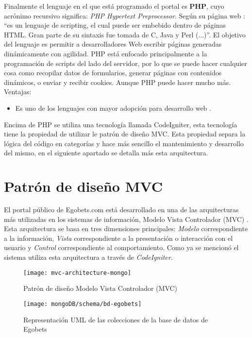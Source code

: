 Finalmente el lenguaje en el que está programado el portal es \textbf{PHP}, cuyo acrónimo recursivo significa: \emph{PHP Hypertext Preprocessor}. Según su página web \cite{phpWeb}: ``es un lenguaje de scripting, el cual puede ser embebido dentro de páginas HTML. Gran parte de su sintaxis fue tomada de C, Java y Perl (...)''. El objetivo del lenguaje es permitir a desarrolladores Web escribir páginas generadas dinámicamente con agilidad.
PHP está enfocado principalmente a la programación de scripts del lado del servidor, por lo que se puede hacer cualquier cosa como recopilar datos de formularios, generar páginas con contenidos dinámicos, o enviar y recibir cookies. Aunque PHP puede hacer mucho más.
				 Ventajas:
	\begin{itemize}
		\item Es uno de los lenguajes con mayor adopción para desarrollo web \cite{tiobeIndex}.
	\end{itemize}

Encima de PHP se utiliza una tecnología llamada CodeIgniter, esta tecnología tiene la propiedad de utilizar le patrón de diseño MVC. Esta propiedad separa la lógica del código en categorías y hace más sencillo el mantenimiento y desarrollo del mismo, en el siguiente apartado se detalla más esta arquitectura.

\section{Patrón de diseño MVC}

El portal público de Egobets.com está desarrollado en una de las arquitecturas más utilizadas en los sistemas de información, Modelo Vista Controlador (MVC) \cite{alfredo2005ingenieria}. Esta arquitectura se basa en tres dimensiones principales: \emph{Modelo} correspondiente a la información, \emph{Vista} correspondiente a la presentación o interacción con el usuario y \emph{Control} correspondiente al comportamiento. Como ya se mencionó el sistema utiliza esta arquitectura a través de \emph{CodeIgniter}.

\begin{figure}[!htb]\centering
   \begin {minipage}{1\textwidth}
     \texttt{[image: mvc-architecture-mongo]}
     \caption{Patrón de diseño Modelo Vista Controlador (MVC)}\label{Fig:mvc}
   \end{minipage}
\end{figure}

	\begin{figure}[!htb]\centering
	   \begin {minipage}{1\textwidth}
	     \texttt{[image: mongoDB/schema/bd-egobets]}
	     \caption{Representación UML de las colecciones de la base de datos de Egobets}\label{Fig:db-egobets}
	   \end{minipage}
	\end{figure}


